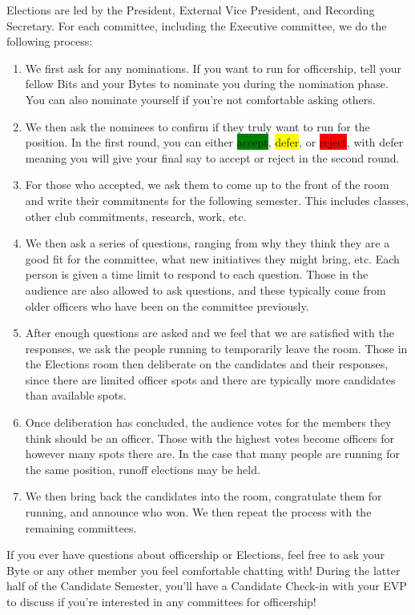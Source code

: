 \documentclass[11pt, article, oneside]{memoir}
\begin{document}
        Elections are led by the President, External Vice President, and Recording Secretary.
        For each committee, including the Executive committee, we do the following process:
        \begin{enumerate}
            \item
                We first ask for any nominations.
                If you want to run for officership, tell your fellow Bits and your Bytes to nominate you during the nomination phase.
                You can also nominate yourself if you're not comfortable asking others.
            \item
                We then ask the nominees to confirm if they truly want to run for the position.
                In the first round, you can either \colorbox{green}{accept}, \colorbox{yellow}{defer}, or \colorbox{red}{reject}, with defer meaning you will give your final say to accept or reject in the second round.
            \item
                For those who accepted, we ask them to come up to the front of the room and write their commitments for the following semester.
                This includes classes, other club commitments, research, work, etc.
            \item
                We then ask a series of questions, ranging from why they think they are a good fit for the committee, what new initiatives they might bring, etc.
                Each person is given a time limit to respond to each question.
                Those in the audience are also allowed to ask questions, and these typically come from older officers who have been on the committee previously.
            \item
                After enough questions are asked and we feel that we are satisfied with the responses, we ask the people running to temporarily leave the room.
                Those in the Elections room then deliberate on the candidates and their responses, since there are limited officer spots and there are typically more candidates than available spots.
            \item
                Once deliberation has concluded, the audience votes for the members they think should be an officer.
                Those with the highest votes become officers for however many spots there are.
                In the case that many people are running for the same position, runoff elections may be held.
            \item
                We then bring back the candidates into the room, congratulate them for running, and announce who won.
                We then repeat the process with the remaining committees.
        \end{enumerate}
        If you ever have questions about officership or Elections, feel free to ask your Byte or any other member you feel comfortable chatting with!
        During the latter half of the Candidate Semester, you'll have a Candidate Check-in with your EVP to discuss if you're interested in any committees for officership!
\end{document}
